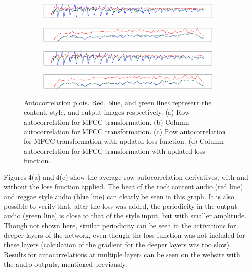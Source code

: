 \documentclass{article}
\begin{document}
\begin{figure}[!h]
\begin{subfigure}{\textwidth}
  \centering
  \includegraphics[width = \textwidth]{row_ac_mfcc_input}
  \caption{}
\end{subfigure}
\begin{subfigure}{\textwidth}
  \centering
  \includegraphics[width = \textwidth]{col_ac_mfcc_input}
  \caption{}
\end{subfigure}
\begin{subfigure}{\textwidth}
  \centering
  \includegraphics[width = \textwidth]{row_ac_input}
  \caption{}
\end{subfigure}
\begin{subfigure}{\textwidth}
  \centering
  \includegraphics[width = \textwidth]{col_ac_input}
  \caption{}
\end{subfigure}
\caption{Autocorrelation plots. Red, blue, and green lines represent the content, style, and output images respectively. (a) Row autocorrelation for MFCC transformation. (b) Column autocorrelation for MFCC transformation. (c) Row autocorrelation for MFCC transformation with updated loss function. (d) Column autocorrelation for MFCC transformation with updated loss function.}
\end{figure}

Figures 4(a) and 4(c) show the average row autocorrelation derivatives, with and without the loss function applied. The beat of the rock content audio (red line) and reggae style audio (blue line) can clearly be seen in this graph. It is also possible to verify that, after the loss was added, the periodicity in the output audio (green line) is close to that of the style input, but with smaller amplitude. Though not shown here, similar periodicity can be seen in the activations for deeper layers of the network, even though the loss function was not included for these layers (calculation of the gradient for the deeper layers was too slow). Results for autocorrelations at multiple layers can be seen on the website with the audio outputs, mentioned previously.
\end{document}
